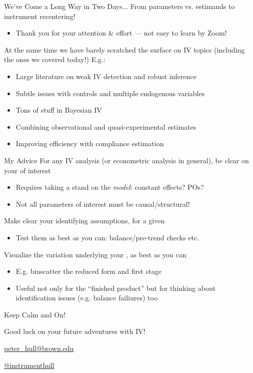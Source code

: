 \documentclass{beamer}
\begin{document}

\begin{frame}{We've Come a Long Way in Two Days...}
From parameters vs. estimands to instrument recentering!\smallskip
\begin{itemize}
\item Thank you for your attention \& effort --- not easy to learn by Zoom! 
\end{itemize}\bigskip\pause{}

At the same time we have barely scratched the surface on IV topics (including the ones we covered today!) E.g.:\smallskip
\begin{itemize}
\item Large literature on weak IV detection and robust inference\smallskip
\item Subtle issues with controls and multiple endogenous variables\smallskip
\item Tons of stuff in Bayesian IV\smallskip
\item Combining observational and quasi-experimental estimates\smallskip
\item Improving efficiency with compliance estimation
\end{itemize}
\end{frame}

\begin{frame}{My Advice}
For any IV analysis (or econometric analysis in general), be clear on your  of interest\smallskip
\begin{itemize}
\item Requires taking a stand on the \emph{model}: constant effects? POs? \smallskip
\item Not all parameters of interest must be causal/structural!
\end{itemize}\medskip\pause{}

Make clear your identifying assumptions, for a given \smallskip
\begin{itemize}
\item Test them as best as you can: balance/pre-trend checks etc.
\end{itemize}\medskip\pause{}

Visualize the variation underlying your , as best as you can\smallskip
\begin{itemize}
\item E.g. binscatter the reduced form and first stage\smallskip
\item Useful not only for the ``finished product'' but for thinking about identification issues (e.g. balance failiures) too
\end{itemize}

\end{frame}

\begin{frame}{Keep Calm and  On!}

\begin{center}
Good luck on your future adventures with IV!

\bigskip
\url{peter_hull@brown.edu}

\bigskip
 \url{@instrumenthull}
\end{center}
\end{frame}
\end{document}
